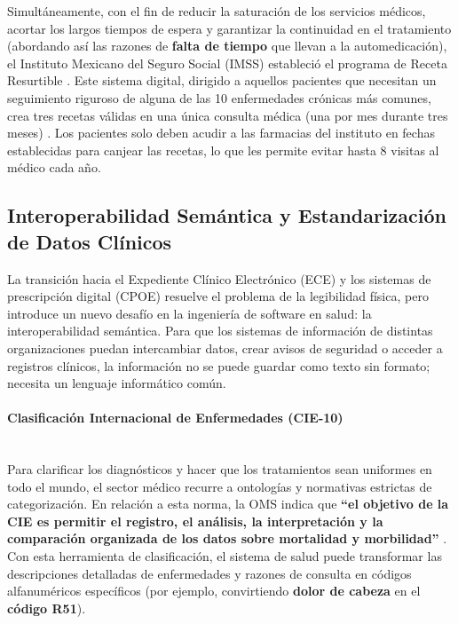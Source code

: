 Simultáneamente, con el fin de reducir la saturación de los servicios médicos, acortar los largos tiempos de espera y garantizar la continuidad en el tratamiento (abordando así las razones de \textbf{falta de tiempo} que llevan a la automedicación), el Instituto Mexicano del Seguro Social (IMSS) estableció el programa de Receta Resurtible \cite{imss_receta_resurtible}. Este sistema digital, dirigido a aquellos pacientes que necesitan un seguimiento riguroso de alguna de las 10 enfermedades crónicas más comunes, crea tres recetas válidas en una única consulta médica (una por mes durante tres meses) \cite{imss_receta_resurtible}. Los pacientes solo deben acudir a las farmacias del instituto en fechas establecidas para canjear las recetas, lo que les permite evitar hasta 8 visitas al médico cada año.

\subsection{Interoperabilidad Semántica y Estandarización de Datos Clínicos}

La transición hacia el Expediente Clínico Electrónico (ECE) y los sistemas de prescripción digital (CPOE) resuelve el problema de la legibilidad física, pero introduce un nuevo desafío en la ingeniería de software en salud: la interoperabilidad semántica. Para que los sistemas de información de distintas organizaciones puedan intercambiar datos, crear avisos de seguridad o acceder a registros clínicos, la información no se puede guardar como texto sin formato; necesita un lenguaje informático común.

\paragraph{Clasificación Internacional de Enfermedades (CIE-10)} \leavevmode \\

Para clarificar los diagnósticos y hacer que los tratamientos sean uniformes en todo el mundo, el sector médico recurre a ontologías y normativas estrictas de categorización. En relación a esta norma, la OMS indica que \textbf{“el objetivo de la CIE es permitir el registro, el análisis, la interpretación y la comparación organizada de los datos sobre mortalidad y morbilidad”} \cite{WHO2004}. Con esta herramienta de clasificación, el sistema de salud puede transformar las descripciones detalladas de enfermedades y razones de consulta en códigos alfanuméricos específicos (por ejemplo, convirtiendo \textbf{dolor de cabeza} en el \textbf{código R51}).

